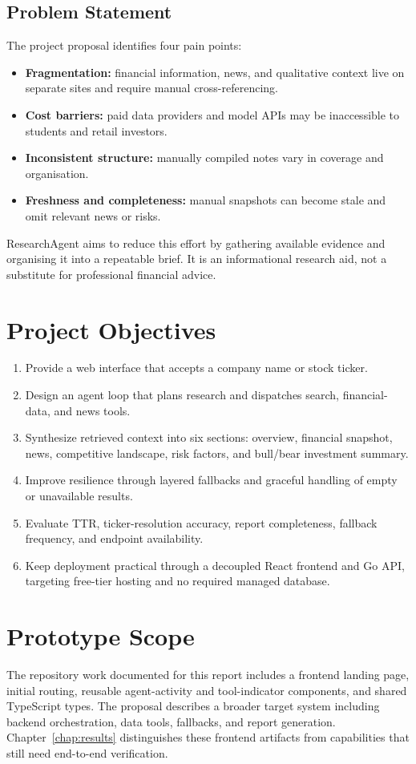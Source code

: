\documentclass[12pt,a4paper,oneside]{report}
\begin{document}
\subsection{Problem Statement}
The project proposal identifies four pain points:
\begin{itemize}[leftmargin=*]
\item \textbf{Fragmentation:} financial information, news, and qualitative context live on separate sites and require manual cross-referencing.
\item \textbf{Cost barriers:} paid data providers and model APIs may be inaccessible to students and retail investors.
\item \textbf{Inconsistent structure:} manually compiled notes vary in coverage and organisation.
\item \textbf{Freshness and completeness:} manual snapshots can become stale and omit relevant news or risks.
\end{itemize}
ResearchAgent aims to reduce this effort by gathering available evidence and organising it into a repeatable brief. It is an informational research aid, not a substitute for professional financial advice.

\section{Project Objectives}
\begin{enumerate}[leftmargin=*]
\item Provide a web interface that accepts a company name or stock ticker.
\item Design an agent loop that plans research and dispatches search, financial-data, and news tools.
\item Synthesize retrieved context into six sections: overview, financial snapshot, news, competitive landscape, risk factors, and bull/bear investment summary.
\item Improve resilience through layered fallbacks and graceful handling of empty or unavailable results.
\item Evaluate TTR, ticker-resolution accuracy, report completeness, fallback frequency, and endpoint availability.
\item Keep deployment practical through a decoupled React frontend and Go API, targeting free-tier hosting and no required managed database.
\end{enumerate}

\section{Prototype Scope}
The repository work documented for this report includes a frontend landing page, initial routing, reusable agent-activity and tool-indicator components, and shared TypeScript types. The proposal describes a broader target system including backend orchestration, data tools, fallbacks, and report generation. Chapter~\ref{chap:results} distinguishes these frontend artifacts from capabilities that still need end-to-end verification.
\end{document}
